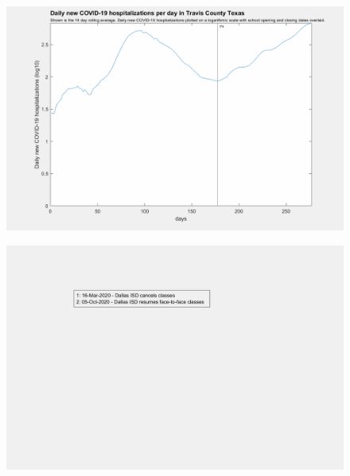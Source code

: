 \documentclass[]{article}
\begin{document}
\begin{figure}[!h]
	\includegraphics[width=\linewidth]{images/travis_hospitalizations_school_log.png}
	\caption{}
	\label{fig:images/travis_hospitalizations_school_logLabel}
\end{figure}

\begin{figure}[!h]
	\includegraphics[width=\linewidth]{legends/dallas_school_legend.png}
	\caption{}
	\label{fig:legends/dallas_school_legendLabel}
\end{figure}
\end{document}
